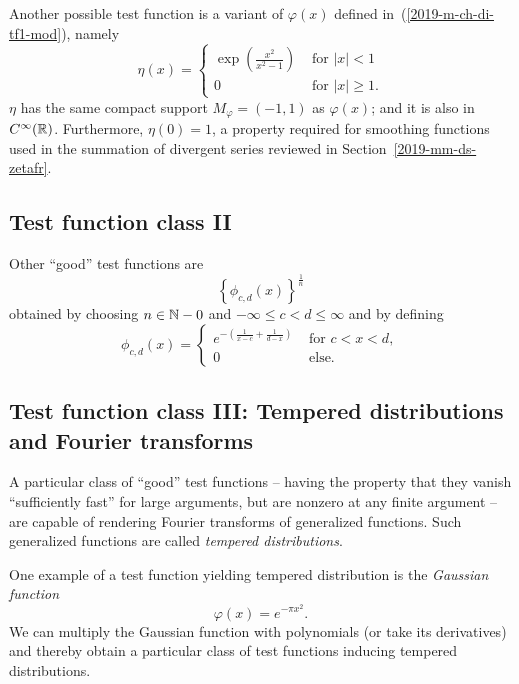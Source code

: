 Another possible test function\cite{sommer-tao-glaettung} is a variant of $\varphi(x)$ defined in~(\ref{2019-m-ch-di-tf1-mod}), namely
\begin{equation}
   \eta (x)=
\begin{cases}
\exp \left( \frac{x^2}{x^2-1}\right) &\textrm{ for } |x|<1\\
                 0 &\textrm{ for }|x|\geq 1
.
\end{cases}
\label{2019-m-ch-di-tf1-mod1}
\end{equation}
$\eta $ has the same compact  support  $M_\varphi=(-1,1)$ as $\varphi(x)$; and it is also in $C^\infty({\Bbb R})$.
Furthermore, $\eta (0) =1$, a property required for smoothing functions used in the summation of divergent series
reviewed in Section~\ref{2019-mm-ds-zetafr}.


\subsection{Test function class II}

Other ``good'' test functions are\cite{schwartz}
\begin{equation}
\left\{\phi_{c,d}(x)\right\}^\frac{1}{n}
\end{equation}
obtained by choosing $n\in {\Bbb N} - 0$
and $-\infty \le c<d\le \infty$ and by defining
\begin{equation}
\phi_{c,d}(x)
=
\begin{cases}
e^{-\left( \frac{1}{x-c} + \frac{1}{d-x} \right)} & \textrm{ for }  c<x<d ,   \\
                                                0 & \textrm{ else.}
\end{cases}
\end{equation}



\subsection{Test function class III: Tempered distributions and Fourier transforms}
\label{2019-mm-ft-td}

A particular class of ``good'' test functions -- having the property that they vanish
``sufficiently fast'' for large arguments, but are nonzero at any finite argument --
are capable of rendering Fourier transforms of generalized functions. Such generalized functions are called
{\em tempered distributions}.

One example of a test function yielding tempered distribution is the {\em Gaussian function}
\begin{equation}
\varphi (x)= e^{-\pi x^2}.
\label{2012-m-ch-di-td}
\end{equation}
We can multiply the Gaussian function with polynomials (or take its derivatives) and thereby obtain a particular class of test functions
inducing tempered distributions.


